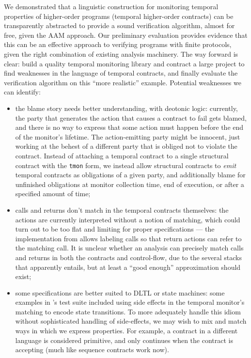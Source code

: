 We demonstrated that a linguistic construction for monitoring temporal properties of higher-order programs (temporal higher-order contracts) can be transparently abstracted to provide a sound verification algorithm, almost for free, given the AAM approach.
%
Our preliminary evaluation provides evidence that this can be an effective approach to verifying programs with finite protocols, given the right combination of existing analysis machinery.
%
The way forward is clear: build a quality temporal monitoring library and contract a large project to find weaknesses in the language of temporal contracts, and finally evaluate the verification algorithm on this ``more realistic'' example.
%
Potential weaknesses we can identify:
\begin{itemize}
\item{the blame story needs better understanding, with deotonic logic:
%
currently, the party that generates the action that causes a contract to fail gets blamed, and there is no way to express that some action must happen before the end of the monitor's lifetime.
%
The action-emitting party might be innocent, just working at the behest of a different party that is obliged not to violate the contract.
%
Instead of attaching a temporal contract to a single structural contract with the {\tt tmon} form, we instead allow structural contracts to \emph{emit} temporal contracts as obligations of a given party, and additionally blame for unfinished obligations at monitor collection time, end of execution, or after a specified amount of time;
}
%
\item{calls and returns don't match in the temporal contracts themselves:
%
the actions are currently interpreted without a notion of matching, which could turn out to be too flat and limiting for proper specifications --- the implementation from \dfm{} allows labeling calls so that return actions can refer to the matching call.
%
It is unclear whether an analysis can precisely match calls and returns in both the contracts and control-flow, due to the several stacks that apparently entails, but at least a ``good enough'' approximation should exist;
}
%
\item{some specifications are better suited to DLTL or state machines:
%
some examples in \dfm's test suite included using side effects in the temporal monitor's matching to encode state transitions.
To more adequately handle this idiom without sophisticated handling of side-effects, we may wish to mix and match ways in which we express properties.
%
For example, a contract in a different language is considered primitive, and only continues when the contract is accepting (much like sequence contracts work now).
}
\end{itemize}
